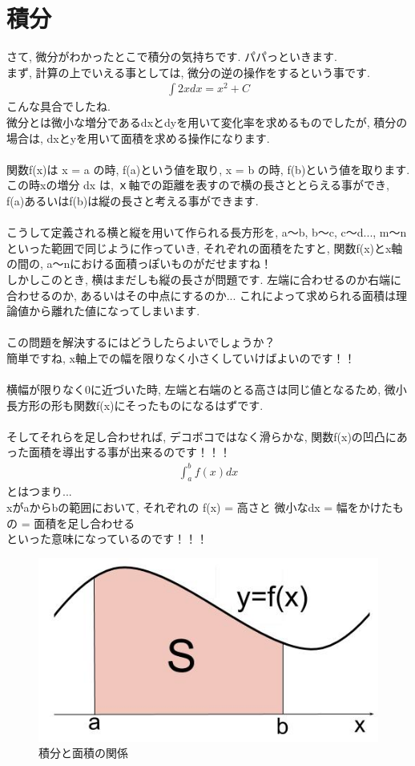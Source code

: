 \documentclass[11pt,a4paper]{jreport}
\begin{document}
\section{積分}
さて, 微分がわかったとこで積分の気持ちです. パパっといきます.\\
まず, 計算の上でいえる事としては, 微分の逆の操作をするという事です.
\begin{eqnarray}
\int 2x dx= x^2 + C
\end{eqnarray}
こんな具合でしたね. \\
微分とは微小な増分であるdxとdyを用いて変化率を求めるものでしたが, 積分の場合は, dxとyを用いて面積を求める操作になります.\\
\\
関数f(x)は x = a の時, f(a)という値を取り, x = b の時, f(b)という値を取ります. この時xの増分 dx は, ｘ軸での距離を表すので横の長さととらえる事ができ, f(a)あるいはf(b)は縦の長さと考える事ができます.\\
\\
こうして定義される横と縦を用いて作られる長方形を, a～b, b～c, c～d..., m～nといった範囲で同じように作っていき, それぞれの面積をたすと, 関数f(x)とx軸の間の, a～nにおける面積っぽいものがだせますね！\\
しかしこのとき, 横はまだしも縦の長さが問題です. 左端に合わせるのか右端に合わせるのか, あるいはその中点にするのか... これによって求められる面積は理論値から離れた値になってしまいます.\\
\\
この問題を解決するにはどうしたらよいでしょうか？\\
簡単ですね, x軸上での幅を限りなく小さくしていけばよいのです！！\\
\\
横幅が限りなく0に近づいた時, 左端と右端のとる高さは同じ値となるため, 微小長方形の形も関数f(x)にそったものになるはずです.\\
\\
そしてそれらを足し合わせれば, デコボコではなく滑らかな, 関数f(x)の凹凸にあった面積を導出する事が出来るのです！！！
\begin{eqnarray}
\int_a^b f(x) dx
\end{eqnarray}
とはつまり...\\
xがaからbの範囲において, それぞれの f(x) = 高さと 微小なdx = 幅をかけたもの = 面積を足し合わせる\\
といった意味になっているのです！！！


\begin{figure}[H]
\label{im:integral}
  \centering
  \includegraphics[width=120mm,bb=0 0 480 259]{figures/int.jpg}
  \caption{積分と面積の関係}
\end{figure}
\end{document}
